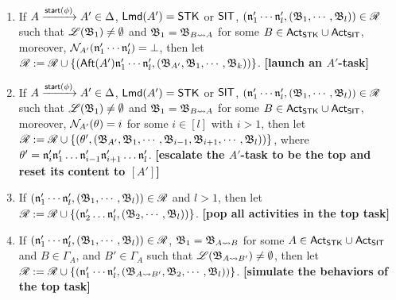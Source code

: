 \smallskip
\fbox
{
\begin{minipage}{0.9\textwidth}
\begin{enumerate}
    \item If $A \xrightarrow{{\mathsf{start} }(\phi)}A' \in\Delta$, ${\sf Lmd}(A')=\mathsf{STK}$ or ${\sf SIT}$, $(\mathfrak{n}'_1 \cdots \mathfrak{n}'_l, ({\mathfrak{B} }_1,\cdots,{\mathfrak{B} }_l)) \in \mathscr{R}$ such that ${\mathscr{L} }({\mathfrak{B} }_1) \neq \emptyset$ and ${\mathfrak{B} }_1 = {\mathfrak{B} }_{B\rightsquigarrow A}$ for some $B \in {\sf Act}_{\sf STK}\cup{\sf Act}_{\sf SIT}$, moreover, $\mathcal{N}_{A'}(\mathfrak{n}'_1 \cdots \mathfrak{n}'_l) = \bot$,
    then let $\mathscr{R}: = \mathscr{R} \cup \{({\sf Aft}(A')\mathfrak{n}'_1 \cdots \mathfrak{n}'_l, ({\mathfrak{B} }_{A'},{\mathfrak{B} }_1,\cdots,{\mathfrak{B} }_k))\}$.
        \textbf{[launch an $A'$-task]}

    \item If $A \xrightarrow{{\mathsf{start} }(\phi)}A' \in\Delta$, ${\sf Lmd}(A')=\mathsf{STK}$ or ${\sf SIT}$, $(\mathfrak{n}'_1 \cdots \mathfrak{n}'_l, ({\mathfrak{B} }_1,\cdots,{\mathfrak{B} }_l)) \in \mathscr{R}$ such that ${\mathscr{L} }({\mathfrak{B} }_1) \neq \emptyset$ and ${\mathfrak{B} }_1 = {\mathfrak{B} }_{B\rightsquigarrow A}$ for some $B \in {\sf Act}_{\sf STK}\cup{\sf Act}_{\sf SIT}$, moreover, $\mathcal{N}_{A'}(\theta) = i$ for some $i \in [l]$ with $i > 1$, 
        then let $\mathscr{R}:= \mathscr{R} \cup \{(\theta', ({\mathfrak{B} }_{A'}, {\mathfrak{B} }_1, \cdots,{\mathfrak{B} }_{i-1},{\mathfrak{B} }_{i+1},\cdots,{\mathfrak{B} }_{l}))\}$, where $\theta' = \mathfrak{n}'_i\mathfrak{n}'_1\dots\mathfrak{n}'_{i-1}\mathfrak{n}'_{i+1}\dots\mathfrak{n}'_l$. 
        \textbf{[escalate the $A'$-task to be the top and reset its content to $[A']$]}
    \item If $(\mathfrak{n}'_1 \cdots \mathfrak{n}'_l, ({\mathfrak{B} }_1,\cdots,{\mathfrak{B} }_l)) \in \mathscr{R}$ and $l>1$, then let $\mathscr{R} := \mathscr{R} \cup \{(\mathfrak{n}'_2\dots\mathfrak{n}'_l, ({\mathfrak{B} }_2,\cdots,{\mathfrak{B} }_l))\}$.
        \textbf{[pop all activities in the top task]}
%
    \item If $(\mathfrak{n}'_1 \cdots \mathfrak{n}'_l, ({\mathfrak{B} }_1,\cdots,{\mathfrak{B} }_l)) \in \mathscr{R}$, ${\mathfrak{B} }_1 = {\mathfrak{B} }_{A\rightsquigarrow B}$ for some $A\in{\sf Act}_{\mathsf{STK}}\cup{\sf Act}_{\mathsf{SIT}}$ and $B \in \Gamma_A$, and $B'  \in \Gamma_A$ such that ${\mathscr{L} }({\mathfrak{B} }_{A\rightsquigarrow B'}) \neq \emptyset$, then let 
    $\mathscr{R} := \mathscr{R} \cup \{(\mathfrak{n}'_1 \cdots \mathfrak{n}'_l, ({\mathfrak{B} }_{A\rightsquigarrow B'}, {\mathfrak{B} }_2,\cdots,{\mathfrak{B} }_l))\}$. 
        \textbf{[simulate the behaviors of the top task]}
\end{enumerate}
\end{minipage}
}

